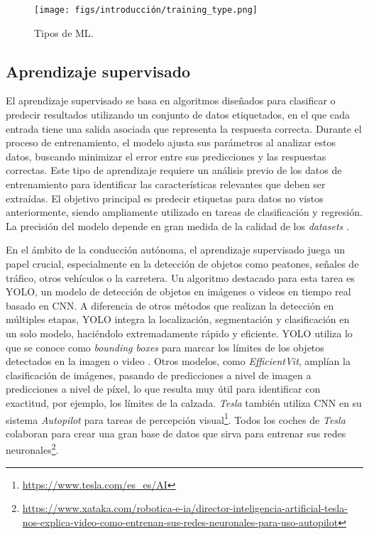 \begin{figure}[ht]
\begin{center}
\texttt{[image: figs/introducción/training\_type.png]}
\end{center}
\caption{Tipos de \ac{ML}.}
\label{fig:ml}
\end{figure}

\subsection{Aprendizaje supervisado}

El aprendizaje supervisado se basa en algoritmos diseñados para clasificar o predecir resultados utilizando un conjunto de datos etiquetados, en el que cada entrada tiene una salida asociada que representa la respuesta correcta. Durante el proceso de entrenamiento, el modelo ajusta sus parámetros al analizar estos datos, buscando minimizar el error entre sus predicciones y las respuestas correctas. Este tipo de aprendizaje requiere un análisis previo de los datos de entrenamiento para identificar las características relevantes que deben ser extraídas. El objetivo principal es predecir etiquetas para datos no vistos anteriormente, siendo ampliamente utilizado en tareas de clasificación y regresión. La precisión del modelo depende en gran medida de la calidad de los \textit{datasets} \cite{supervised-learning}.

En el ámbito de la conducción autónoma, el aprendizaje supervisado juega un papel crucial, especialmente en la detección de objetos como peatones, señales de tráfico, otros vehículos o la carretera. Un algoritmo destacado para esta tarea es \ac{YOLO}, un modelo de detección de objetos en imágenes o videos en tiempo real basado en \ac{CNN}. A diferencia de otros métodos que realizan la detección en múltiples etapas, \ac{YOLO} integra la localización, segmentación y clasificación en un solo modelo, haciéndolo extremadamente rápido y eficiente. \ac{YOLO} utiliza lo que se conoce como \textit{bounding boxes} para marcar los límites de los objetos detectados en la imagen o video \cite{yolo}. Otros modelos, como \textit{EfficientVit}, amplían la clasificación de imágenes, pasando de predicciones a nivel de imagen a predicciones a nivel de píxel, lo que resulta muy útil para identificar con exactitud, por ejemplo, los límites de la calzada. \textit{Tesla} también utiliza \ac{CNN} en su sistema \textit{Autopilot} para tareas de percepción visual\footnote{\url{https://www.tesla.com/es_es/AI}}. Todos los coches de \textit{Tesla} colaboran para crear una gran base de datos que sirva para entrenar sus redes neuronales\footnote{\url{https://www.xataka.com/robotica-e-ia/director-inteligencia-artificial-tesla-nos-explica-video-como-entrenan-sus-redes-neuronales-para-uso-autopilot}}. 

